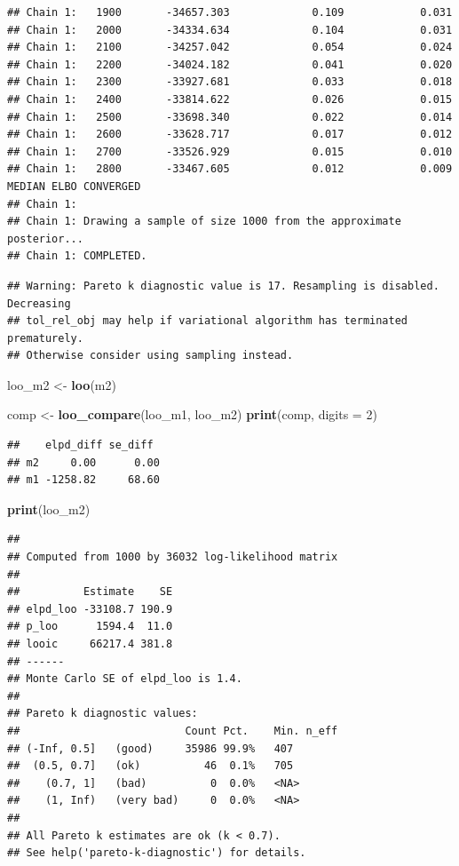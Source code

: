 \documentclass[
]{article}
\newenvironment{Shaded}{\begin{snugshade}}{\end{snugshade}}
\newcommand{\AttributeTok}[1]{\textcolor[rgb]{0.13,0.29,0.53}{#1}}
\newcommand{\DecValTok}[1]{\textcolor[rgb]{0.00,0.00,0.81}{#1}}
\newcommand{\FunctionTok}[1]{\textcolor[rgb]{0.13,0.29,0.53}{\textbf{#1}}}
\newcommand{\NormalTok}[1]{#1}
\newcommand{\OtherTok}[1]{\textcolor[rgb]{0.56,0.35,0.01}{#1}}
\begin{document}
\begin{verbatim}
## Chain 1:   1900       -34657.303             0.109            0.031
## Chain 1:   2000       -34334.634             0.104            0.031
## Chain 1:   2100       -34257.042             0.054            0.024
## Chain 1:   2200       -34024.182             0.041            0.020
## Chain 1:   2300       -33927.681             0.033            0.018
## Chain 1:   2400       -33814.622             0.026            0.015
## Chain 1:   2500       -33698.340             0.022            0.014
## Chain 1:   2600       -33628.717             0.017            0.012
## Chain 1:   2700       -33526.929             0.015            0.010
## Chain 1:   2800       -33467.605             0.012            0.009   MEDIAN ELBO CONVERGED
## Chain 1: 
## Chain 1: Drawing a sample of size 1000 from the approximate posterior... 
## Chain 1: COMPLETED.
\end{verbatim}

\begin{verbatim}
## Warning: Pareto k diagnostic value is 17. Resampling is disabled. Decreasing
## tol_rel_obj may help if variational algorithm has terminated prematurely.
## Otherwise consider using sampling instead.
\end{verbatim}

\begin{Shaded}
\begin{Highlighting}[]
\NormalTok{loo\_m2 }\OtherTok{\textless{}{-}} \FunctionTok{loo}\NormalTok{(m2)}

\NormalTok{comp }\OtherTok{\textless{}{-}} \FunctionTok{loo\_compare}\NormalTok{(loo\_m1, loo\_m2)}
\FunctionTok{print}\NormalTok{(comp, }\AttributeTok{digits =} \DecValTok{2}\NormalTok{)}
\end{Highlighting}
\end{Shaded}

\begin{verbatim}
##    elpd_diff se_diff 
## m2     0.00      0.00
## m1 -1258.82     68.60
\end{verbatim}

\begin{Shaded}
\begin{Highlighting}[]
\FunctionTok{print}\NormalTok{(loo\_m2)}
\end{Highlighting}
\end{Shaded}

\begin{verbatim}
## 
## Computed from 1000 by 36032 log-likelihood matrix
## 
##          Estimate    SE
## elpd_loo -33108.7 190.9
## p_loo      1594.4  11.0
## looic     66217.4 381.8
## ------
## Monte Carlo SE of elpd_loo is 1.4.
## 
## Pareto k diagnostic values:
##                          Count Pct.    Min. n_eff
## (-Inf, 0.5]   (good)     35986 99.9%   407       
##  (0.5, 0.7]   (ok)          46  0.1%   705       
##    (0.7, 1]   (bad)          0  0.0%   <NA>      
##    (1, Inf)   (very bad)     0  0.0%   <NA>      
## 
## All Pareto k estimates are ok (k < 0.7).
## See help('pareto-k-diagnostic') for details.
\end{verbatim}
\end{document}
